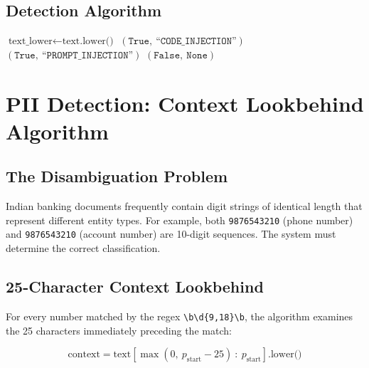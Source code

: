 \subsection{Detection Algorithm}

\begin{algorithm}[H]
\caption{Threat Detection}
\begin{algorithmic}[1]
    \State $\text{text\_lower} \gets \text{text.lower()}$
            \State \Return $(\texttt{True},\ \texttt{``CODE\_INJECTION''})$
        \EndIf
    \EndFor
            \State \Return $(\texttt{True},\ \texttt{``PROMPT\_INJECTION''})$
        \EndIf
    \EndFor
    \State \Return $(\texttt{False},\ \texttt{None})$
\EndProcedure
\end{algorithmic}
\end{algorithm}

\section{PII Detection: Context Lookbehind Algorithm}

\subsection{The Disambiguation Problem}

Indian banking documents frequently contain digit strings of identical length that represent different entity types. For example, both \texttt{9876543210} (phone number) and \texttt{9876543210} (account number) are 10-digit sequences. The system must determine the correct classification.

\subsection{25-Character Context Lookbehind}

For every number matched by the regex \texttt{\textbackslash b\textbackslash d\{9,18\}\textbackslash b}, the algorithm examines the 25 characters immediately preceding the match:

\begin{equation}
\text{context} = \text{text}[\max(0,\ p_{\text{start}} - 25)\ :\ p_{\text{start}}].\text{lower()}
\end{equation}

